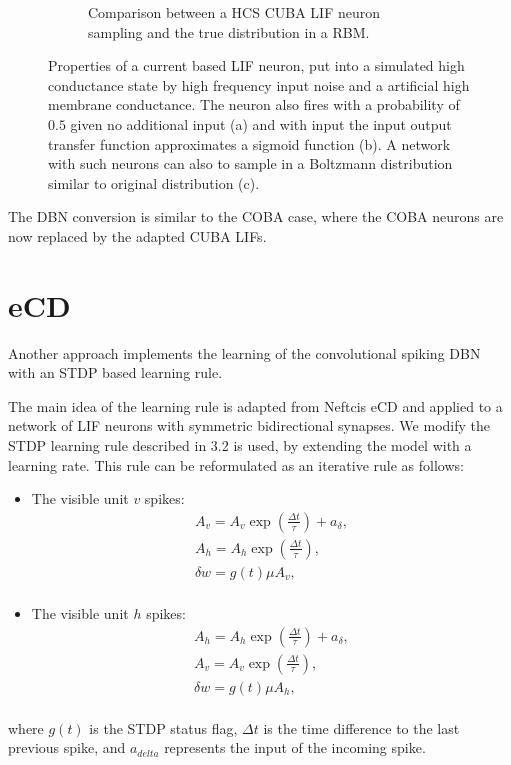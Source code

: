 \begin{figure}
\begin{subfigure}[t]{.5\textwidth}
  		\caption{Comparison between a HCS CUBA LIF neuron sampling and the true distribution in a RBM.}
  		\label{fig:sub2}
	\end{subfigure}
	\caption{Properties of a current based LIF neuron, put into a simulated high conductance state by high frequency input noise and a artificial high membrane conductance. The neuron also fires with a probability of $0.5$ given no additional input (a) and with input the input output transfer function approximates a sigmoid function (b). A network with such neurons can also to sample in a Boltzmann distribution similar to original distribution (c).}
	\label{fig:cubahcs}
\end{figure}
The DBN conversion is similar to the COBA case, where the COBA neurons are now replaced by the adapted CUBA LIFs.

\section{eCD}

Another approach implements the learning of the convolutional spiking DBN with an STDP based learning rule. 

The main idea of the learning rule is adapted from Neftcis eCD and applied to a network of LIF neurons with symmetric bidirectional synapses.
We modify the STDP learning rule described in 3.2 is used, by extending the model with a learning rate. 
This rule can be reformulated as an iterative rule as follows:
\begin{itemize}
\item The visible unit $v$ spikes: 
\[
\begin{split}
A_v = A_v \exp(\frac{\Delta t}{\tau}) + a_{\delta} ,\\
A_h = A_h \exp(\frac{\Delta t}{\tau}) ,\\
\delta w = g(t) \mu A_v  ,\\
\end{split}
\]
\item The visible unit $h$ spikes: 
\[
\begin{split}
A_h = A_h \exp(\frac{\Delta t}{\tau}) + a_{\delta} ,\\
A_v = A_v \exp(\frac{\Delta t}{\tau}) ,\\
\delta w = g(t) \mu A_h  ,\\
\end{split}
\]
\end{itemize}
where $g(t)$ is the STDP status flag, $\Delta t$ is the time difference to the last previous spike, and $a_{delta}$ represents the input of the incoming spike.


